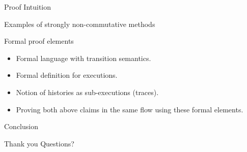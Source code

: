 \documentclass[notes, xcolor=dvipsnames]{beamer}
\begin{document}
    \begin{frame}{Proof Intuition}
        
    \end{frame}

    \begin{frame}{Examples of strongly non-commutative methods}
    \end{frame}

    \begin{frame}{Formal proof elements}
        
        \begin{itemize}
            \item Formal language with transition semantics.
            \item Formal definition for executions.
            \item Notion of histories as sub-executions (traces).
            \item Proving both above claims in the same flow using these formal elements. 
        \end{itemize}

    \end{frame}
    
    \begin{frame}{Conclusion}
        
    \end{frame}

    \begin{frame}{Thank you}
        Questions? 
    \end{frame}
\end{document}
